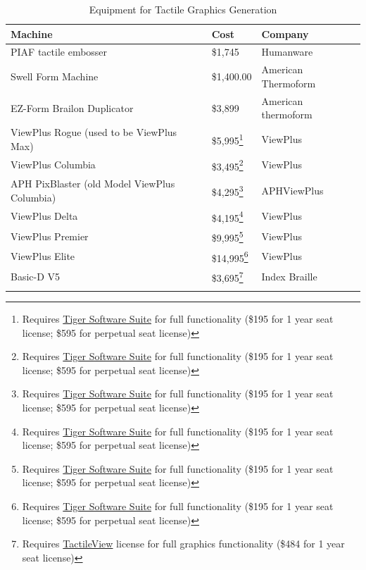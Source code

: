 \documentclass[14pt, letterpaper,twoside]{extreport}
\begin{document}
\begin{longtable}[]{@{}
 >{\raggedright\arraybackslash}p{}
 >{\raggedright\arraybackslash}p{}
 >{\raggedright\arraybackslash}p{}@{}
 }
\textbf{Machine} & \textbf{Cost} & \textbf{Company} \\
\midrule\noalign{}
\endhead
\bottomrule\noalign{}
\endlastfoot
PIAF tactile embosser & \$1,745 & Humanware \\[1.0em]
Swell Form Machine & \$1,400.00 & American Thermoform \\[1.0em]
EZ-Form Brailon Duplicator & \$3,899 & American thermoform \\[1.0em]
ViewPlus Rogue \break (used to be ViewPlus Max) & \$5,995\footnote{Requires \href{https://viewplus.com/product/tiger-software-suite8/}{Tiger Software Suite} for full functionality (\$195 for 1 year seat license; \$595 for perpetual seat license)} & ViewPlus \\[1.0em]
ViewPlus Columbia & \$3,495\footnote{Requires \href{https://viewplus.com/product/tiger-software-suite8/}{Tiger Software Suite} for full functionality (\$195 for 1 year seat license; \$595 for perpetual seat license)} & ViewPlus \\[1.0em]
APH PixBlaster \break (old Model ViewPlus Columbia) & \$4,295\footnote{Requires \href{https://viewplus.com/product/tiger-software-suite8/}{Tiger Software Suite} for full functionality (\$195 for 1 year seat license; \$595 for perpetual seat license)} & APH\break ViewPlus \\[1.0em]
ViewPlus Delta & \$4,195\footnote{Requires \href{https://viewplus.com/product/tiger-software-suite8/}{Tiger Software Suite} for full functionality (\$195 for 1 year seat license; \$595 for perpetual seat license)} & ViewPlus \\[1.0em]
ViewPlus Premier & \$9,995\footnote{Requires \href{https://viewplus.com/product/tiger-software-suite8/}{Tiger Software Suite} for full functionality (\$195 for 1 year seat license; \$595 for perpetual seat license)} & ViewPlus \\[1.0em]
ViewPlus Elite & \$14,995\footnote{Requires \href{https://viewplus.com/product/tiger-software-suite8/}{Tiger Software Suite} for full functionality (\$195 for 1 year seat license; \$595 for perpetual seat license)} & ViewPlus \\[1.0em]
Basic-D V5 & \$3,695\footnote{Requires \href{https://tactileview.com/}{TactileView} license for full graphics functionality (\$484 for 1 year seat license)} & Index Braille \\[1.0em]\hline \caption{ Equipment for Tactile Graphics Generation}
\end{longtable}
\end{document}

